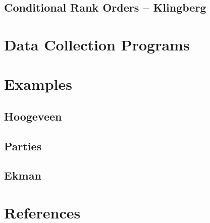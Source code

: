 \documentclass[
  12pt,
]{article}
\begin{document}
\subsection{Conditional Rank Orders -- Klingberg}\label{conditional-rank-orders-klingberg}

\section{Data Collection Programs}\label{data-collection-programs}

\section{Examples}\label{examples}

\subsection{Hoogeveen}\label{hoogeveen}

\subsection{Parties}\label{parties}

\subsection{Ekman}\label{ekman}

\section*{References}\label{references}
\end{document}
